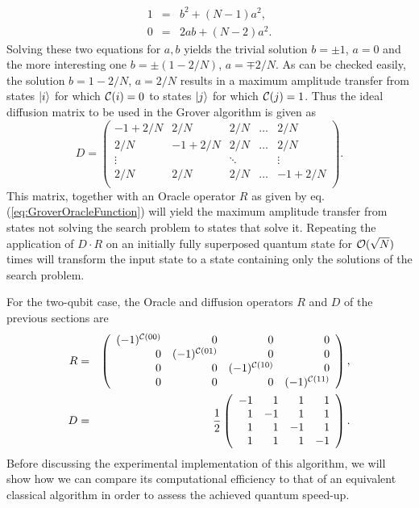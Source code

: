 %
\begin{eqnarray}
 1 & = & b^2+(N-1)a^2, \\
0 & = & 2ab +(N-2)a^2.
\end{eqnarray}
%
Solving these two equations for $a,b$ yields the trivial solution $b = \pm 1$, $a = 0$ and the more interesting one $b = \pm(1-2/N)$, $a=\mp 2/N$. As can be checked easily, the solution $b = 1-2/N$, $a = 2/N$ results in a maximum amplitude transfer from states $\left| i \right>$ for which $\Or(i)=0$ to states $\left| j \right>$ for which $\Or(j)=1$. Thus the ideal diffusion matrix to be used in the Grover algorithm is given as
%
\begin{equation}
D = \left( \begin{array}{ccccc}
	-1+2/N & 2/N & 2/N & \hdots & 2/N \\
	2/N & -1 + 2/N & 2/N & \hdots & 2/N \\
	\vdots & & \ddots &  & \vdots \\
	2/N & 2/N & 2/N & \hdots & -1 + 2/N \\ 
	\end{array} \right). \label{eq:GroverDiffusionOperator}
\end{equation}
%
This matrix, together with an Oracle operator $R$ as given by eq. (\ref{eq:GroverOracleFunction}) will yield the maximum amplitude transfer from states not solving the search problem to states that solve it. Repeating the application of $D\cdot R$ on an initially fully superposed quantum state for $\begin{mathcal}O\end{mathcal}(\sqrt{N})$ times will transform the input state to a state containing only the solutions of the search problem.

\smallskip

For the two-qubit case, the Oracle and diffusion operators $R$ and $D$ of the previous sections are
%
\begin{eqnarray}
	R  & = & \left( \begin{array}{rrrr} (-1)^{\Or(00)} & 0 & 0 & 0 \\ 0 & (-1)^{\Or(01)} & 0 & 0 \\ 0 & 0 & (-1)^{\Or(10)} & 0 \\ 0 & 0 & 0 & (-1)^{\Or(11)} \end{array} \right), \label{eq:two_qubit_oracle_operator} \\
  D  & = & \frac{1}{2}\left( \begin{array}{rrrr} -1 & 1 & 1 & 1 \\ 1 & -1 & 1 & 1 \\ 1 & 1 & -1 & 1 \\ 1 & 1 & 1 & -1 \end{array} \right). \label{eq:two_qubit_diffusion_operator} 
\end{eqnarray}
%
Before discussing the experimental implementation of this algorithm, we will show how we can compare its computational efficiency to that of an equivalent classical algorithm in order to assess the achieved quantum speed-up.

